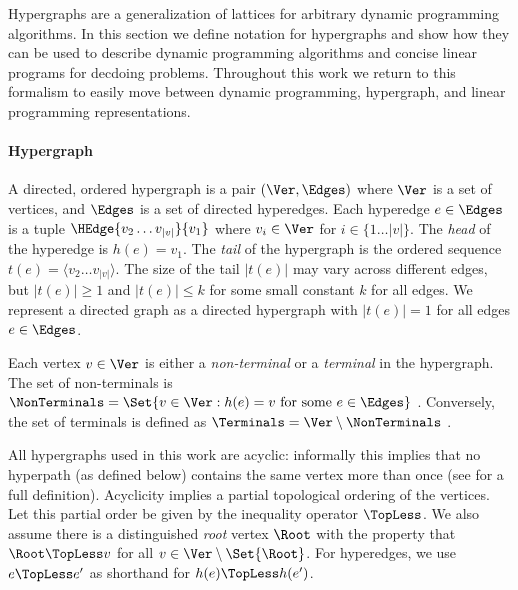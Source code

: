 Hypergraphs are a generalization of lattices for arbitrary dynamic
programming algorithms. In this section we define notation for
hypergraphs and show how they can be used to describe dynamic programming algorithms
and concise linear programs for decdoing problems.
Throughout this work we return to this formalism to easily move
between dynamic programming, hypergraph, and linear programming
representations.


\paragraph{Hypergraph}
A directed, ordered hypergraph is a pair $(\Ver, \Edges)$ where
$\Ver$ is a set of vertices, and $\Edges$ is a
set of directed hyperedges.  Each hyperedge $e \in \Edges$ is a tuple
$\HEdge{v_2 \ldots v_{|v|}}{v_1}$
where $v_i \in \Ver$ for $i \in \{1 \ldots |v|\}$. The {\em head} of the hyperedge is $h(e) = v_1$. The {\em tail} of the hypergraph is the  ordered sequence
$t(e) = \langle v_2 \ldots v_{|v|} \rangle$. The size of the tail $|t(e)|$ may vary
across different edges, but $|t(e)| \geq 1$ and $|t(e)| \leq k$ for
some small constant $k$ for all edges. We represent a directed graph as a directed hypergraph with $|t(e)| = 1$ for all
edges $e \in \Edges$.

Each vertex $v \in \Ver$ is either a {\em non-terminal} or a {\em terminal} in the hypergraph. 
The set of non-terminals is $\NonTerminals = \Set{v \in \Ver: h(e) = v \mathrm{\ for\ some\ }  e \in \Edges}$ .
Conversely, the set of terminals is defined as
$\Terminals = \Ver \setminus \NonTerminals$ .

All  hypergraphs used in this work are acyclic: informally
this implies that no hyperpath (as defined below) contains the same
vertex more than once (see  for a full
definition).
Acyclicity implies a
partial topological ordering of the vertices. Let this partial
order be given by the inequality operator
$\TopLess$.   We also assume there is a
distinguished {\em root} vertex $\Root$ with the property that $\Root \TopLess v$ 
for all $v \in \Ver \setminus \Set{\Root}$. For hyperedges, we use $e \TopLess e'$ as shorthand for $h(e) \TopLess h(e')$.





